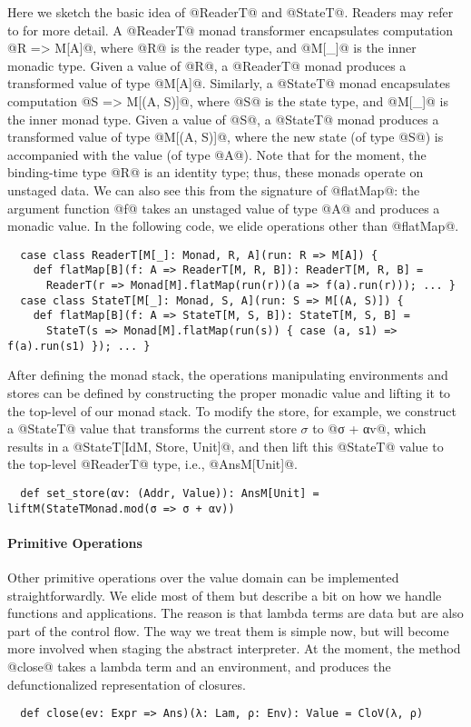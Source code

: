 Here we sketch the basic idea of @ReaderT@ and @StateT@. Readers may
refer to \cite{DBLP:conf/popl/LiangHJ95, Chiusano:2014:FPS:2688794} for more detail.
A @ReaderT@ monad transformer encapsulates computation @R => M[A]@, where
@R@ is the reader type, and @M[_]@ is the inner monadic type.
Given a value of @R@, a @ReaderT@ monad produces a transformed value of type @M[A]@.
Similarly, a @StateT@ monad encapsulates computation @S => M[(A, S)]@, where
@S@ is the state type, and @M[_]@ is the inner monad type.
Given a value of @S@, a @StateT@ monad produces a transformed value of type @M[(A, S)]@,
where the new state (of type @S@) is accompanied with the value (of type @A@).
Note that for the moment, the binding-time type @R@ is an identity type; thus,
these monads operate on unstaged data. We can also see this from the
signature of @flatMap@: the argument function @f@ takes an unstaged value of type @A@ and
produces a monadic value. In the following code, we elide operations other than @flatMap@.
\begin{lstlisting}
  case class ReaderT[M[_]: Monad, R, A](run: R => M[A]) {
    def flatMap[B](f: A => ReaderT[M, R, B]): ReaderT[M, R, B] =
      ReaderT(r => Monad[M].flatMap(run(r))(a => f(a).run(r))); ... }
  case class StateT[M[_]: Monad, S, A](run: S => M[(A, S)]) {
    def flatMap[B](f: A => StateT[M, S, B]): StateT[M, S, B] =
      StateT(s => Monad[M].flatMap(run(s)) { case (a, s1) => f(a).run(s1) }); ... }
\end{lstlisting}

After defining the monad stack, the operations manipulating environments
and stores can be defined by constructing the proper monadic value and lifting it to the
top-level of our monad stack. To modify the store, for example, we construct a
@StateT@ value that transforms the current store $\sigma$ to @σ + αv@, which
results in a @StateT[IdM, Store, Unit]@, and then lift this @StateT@ value to the
top-level @ReaderT@ type, i.e., @AnsM[Unit]@.
\begin{lstlisting}
  def set_store(αv: (Addr, Value)): AnsM[Unit] = liftM(StateTMonad.mod(σ => σ + αv))
\end{lstlisting}

\paragraph{Primitive Operations}
Other primitive operations over the value domain can be implemented
straightforwardly. We elide most of them but describe a bit on how we handle
functions and applications. The reason is that lambda terms are data but are also
part of the control flow. The way we treat them is simple now, but
will become more involved when staging the abstract interpreter.
At the moment, the method @close@ takes a lambda term and an environment, and
produces the defunctionalized representation of closures.
\begin{lstlisting}
  def close(ev: Expr => Ans)(λ: Lam, ρ: Env): Value = CloV(λ, ρ)
\end{lstlisting}

